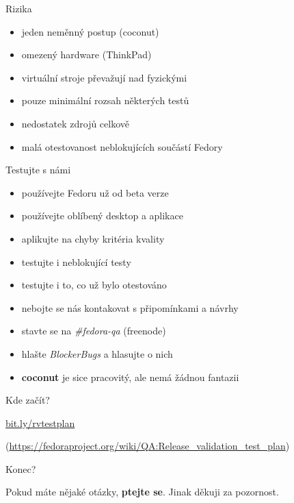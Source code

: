 \documentclass[12pt,aspectratio=169]{beamer}
\begin{document}
\begin{frame}{Rizika}
	
	\begin{itemize}
		\item jeden neměnný postup (coconut)
		\item omezený hardware (ThinkPad)
		\item virtuální stroje převažují nad fyzickými
		\item pouze minimální rozsah některých testů
		\item nedostatek zdrojů celkově
		\item malá otestovanost neblokujících součástí Fedory
	\end{itemize}
\end{frame}

\begin{frame}{Testujte s námi}
	
	\begin{itemize}
		\item používejte Fedoru už od beta verze
		\item používejte oblíbený desktop a aplikace
		\item aplikujte na chyby kritéria kvality
		\item testujte i neblokující testy
		\item testujte i to, co už bylo otestováno
		\item nebojte se nás kontakovat s připomínkami a návrhy
		\item stavte se na \textit{\#fedora-qa} (freenode)
		\item hlašte \textit{BlockerBugs} a hlasujte o nich
		\item \textbf{coconut} je sice pracovitý, ale nemá žádnou fantazii
	\end{itemize}
\end{frame}

\begin{frame}{Kde začít?}
	
{\Large \url{bit.ly/rvtestplan}}

\vspace{10pt}
	
({\small \url{https://fedoraproject.org/wiki/QA:Release_validation_test_plan}})

\end{frame}

\begin{frame}{Konec?}

Pokud máte nějaké otázky, \textbf{ptejte se}. Jinak děkuji za pozornost.

\end{frame}
\end{document}
